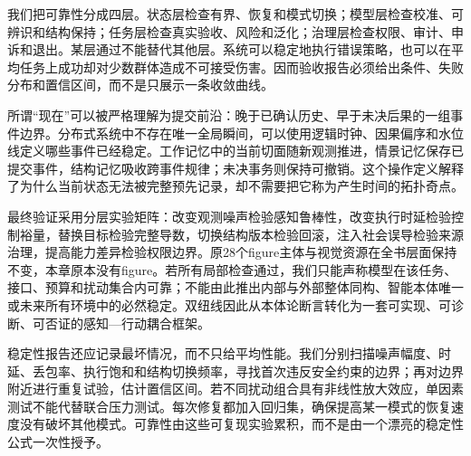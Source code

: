 我们把可靠性分成四层。状态层检查有界、恢复和模式切换；模型层检查校准、可辨识和结构保持；任务层检查真实验收、风险和泛化；治理层检查权限、审计、申诉和退出。某层通过不能替代其他层。系统可以稳定地执行错误策略，也可以在平均任务上成功却对少数群体造成不可接受伤害。因而验收报告必须给出条件、失败分布和置信区间，而不是只展示一条收敛曲线。

所谓“现在”可以被严格理解为提交前沿：晚于已确认历史、早于未决后果的一组事件边界。分布式系统中不存在唯一全局瞬间，可以使用逻辑时钟、因果偏序和水位线定义哪些事件已经稳定。工作记忆中的当前切面随新观测推进，情景记忆保存已提交事件，结构记忆吸收跨事件规律；未决事务则保持可撤销。这个操作定义解释了为什么当前状态无法被完整预先记录，却不需要把它称为产生时间的拓扑奇点。

最终验证采用分层实验矩阵：改变观测噪声检验感知鲁棒性，改变执行时延检验控制裕量，替换目标检验完整导数，切换结构版本检验回滚，注入社会误导检验来源治理，提高能力差异检验权限边界。原28个figure主体与视觉资源在全书层面保持不变，本章原本没有figure。若所有局部检查通过，我们只能声称模型在该任务、接口、预算和扰动集合内可靠；不能由此推出内部与外部整体同构、智能本体唯一或未来所有环境中的必然稳定。双纽线因此从本体论断言转化为一套可实现、可诊断、可否证的感知—行动耦合框架。

稳定性报告还应记录最坏情况，而不只给平均性能。我们分别扫描噪声幅度、时延、丢包率、执行饱和和结构切换频率，寻找首次违反安全约束的边界；再对边界附近进行重复试验，估计置信区间。若不同扰动组合具有非线性放大效应，单因素测试不能代替联合压力测试。每次修复都加入回归集，确保提高某一模式的恢复速度没有破坏其他模式。可靠性由这些可复现实验累积，而不是由一个漂亮的稳定性公式一次性授予。


